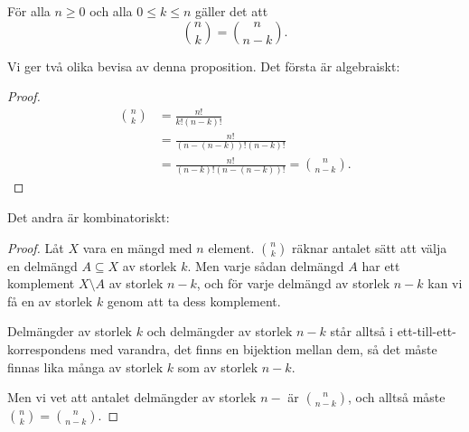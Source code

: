\documentclass{tufte-handout}
\begin{document}
\begin{proposition}
	För alla $n \geq 0$ och alla $0 \leq k \leq n$ gäller det att
	$$\binom{n}{k} = \binom{n}{n-k}.$$
\end{proposition}

Vi ger två olika bevisa av denna proposition. Det första är algebraiskt:
\begin{proof}
	\begin{align*}
		\binom{n}{k} &= \frac{n!}{k!(n-k)!}\\
		&= \frac{n!}{(n-(n-k))!(n-k)!}\\
		&= \frac{n!}{(n-k)!(n-(n-k))!} = \binom{n}{n-k}.
	\end{align*}
\end{proof}

Det andra är kombinatoriskt:
\begin{proof}
	Låt $X$ vara en mängd med $n$ element. $\binom{n}{k}$ räknar antalet sätt att välja en delmängd $A \subseteq X$ av storlek $k$. Men varje sådan delmängd $A$ har ett komplement $X\setminus A$ av storlek $n-k$, och för varje delmängd av storlek $n-k$ kan vi få en av storlek $k$ genom att ta dess komplement.

	Delmängder av storlek $k$ och delmängder av storlek $n-k$ står alltså i ett-till-ett-korrespondens med varandra, det finns en bijektion mellan dem, så det måste finnas lika många av storlek $k$ som av storlek $n-k$.

	Men vi vet att antalet delmängder av storlek $n-$ är $\binom{n}{n-k}$, och alltså måste $\binom{n}{k} = \binom{n}{n-k}$.
\end{proof}



\end{document}
